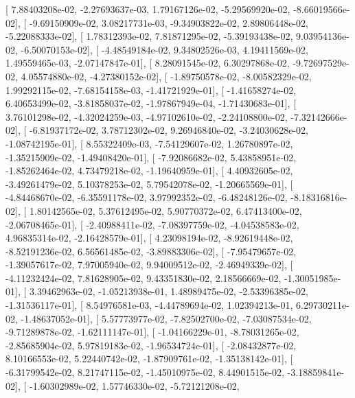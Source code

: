 \documentclass{article}
\begin{document}
       [  7.88403208e-02,  -2.27693637e-03,   1.79167126e-02,
         -5.29569920e-02,  -8.66019566e-02],
       [ -9.69150909e-02,   3.08217731e-03,  -9.34903822e-02,
          2.89806448e-02,  -5.22088333e-02],
       [  1.78312393e-02,   7.81871295e-02,  -5.39193438e-02,
          9.03954136e-02,  -6.50070153e-02],
       [ -4.48549184e-02,   9.34802526e-03,   4.19411569e-02,
          1.49559465e-03,  -2.07147847e-01],
       [  8.28091545e-02,   6.30297868e-02,  -9.72697529e-02,
          4.05574880e-02,  -4.27380152e-02],
       [ -1.89750578e-02,  -8.00582329e-02,   1.99292115e-02,
         -7.68154158e-03,  -1.41721929e-01],
       [ -1.41658274e-02,   6.40653499e-02,  -3.81858037e-02,
         -1.97867949e-04,  -1.71430683e-01],
       [  3.76101298e-02,  -4.32024259e-03,  -4.97102610e-02,
         -2.24108800e-02,  -7.32142666e-02],
       [ -6.81937172e-02,   3.78712302e-02,   9.26946840e-02,
         -3.24030628e-02,  -1.08742195e-01],
       [  8.55322409e-03,  -7.54129607e-02,   1.26780897e-02,
         -1.35215909e-02,  -1.49408420e-01],
       [ -7.92086682e-02,   5.43858951e-02,  -1.85262464e-02,
          4.73479218e-02,  -1.19640959e-01],
       [  4.40932605e-02,  -3.49261479e-02,   5.10378253e-02,
          5.79542078e-02,  -1.20665569e-01],
       [ -4.84468670e-02,  -6.35591178e-02,   3.97992352e-02,
         -6.48248126e-02,  -8.18316816e-02],
       [  1.80142565e-02,   5.37612495e-02,   5.90770372e-02,
          6.47413400e-02,  -2.06708465e-01],
       [ -2.40988411e-02,  -7.08397759e-02,  -4.04538583e-02,
          4.96835314e-02,  -2.16428579e-01],
       [  4.23098194e-02,  -8.92619448e-02,  -8.52191236e-02,
          6.56561485e-02,  -3.89883306e-02],
       [ -7.95479657e-02,  -1.39057617e-02,   7.97005940e-02,
          9.94009512e-02,  -2.46949339e-02],
       [ -4.11232424e-02,   7.81628905e-02,   9.43351830e-02,
          2.18566669e-02,  -1.30051985e-01],
       [  3.39462963e-02,  -1.05213938e-01,   1.48989475e-02,
         -2.53396385e-02,  -1.31536117e-01],
       [  8.54976581e-03,  -4.44789694e-02,   1.02394213e-01,
          6.29730211e-02,  -1.48637052e-01],
       [  5.57773977e-02,  -7.82502700e-02,  -7.03087534e-02,
         -9.71289878e-02,  -1.62111147e-01],
       [ -1.04166229e-01,  -8.78031265e-02,  -2.85685904e-02,
          5.97819183e-02,  -1.96534724e-01],
       [ -2.08432877e-02,   8.10166553e-02,   5.22440742e-02,
         -1.87909761e-02,  -1.35138142e-01],
       [ -6.31799542e-02,   8.21747115e-02,  -1.45010975e-02,
          8.44901515e-02,  -3.18859841e-02],
       [ -1.60302989e-02,   1.57746330e-02,  -5.72121208e-02,
\end{document}
